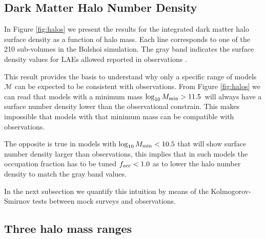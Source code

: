 \documentclass[usenatbib]{mn2e}
\newcommand{\hMsun}{{\ifmmode{h^{-1}{\rm
        {M_{\odot}}}}\else{$h^{-1}{\rm{M_{\odot}}}$}\fi}}
\begin{document}
\subsection{Dark Matter Halo Number Density}

In Figure \ref{fig:halos} we present the results for  the
integrated dark matter halo surface density as a function of halo
mass. Each line corresponds to one of the 210 sub-volumes in the
Bolshoi simulation. The gray band indicates the surface density
values for LAEs allowed reported in observations \citep{Yamada2012}.
 
This result provides the basis to understand why only a specific range of models
${\mathcal M}$ can be expected to be consistent with
observations. From Figure \ref{fig:halos} we can read that models
with a minimum mass $\log_{10} M_{\rm min}>11.5$\hMsun \ will always have a
surface number density lower than the observational
constrain. This makes impossible that models with that minimum mass
can be compatible with observations.


The opposite is true in models with $\log_{10} M_{\rm min}<10.5$
that will show surface number density larger than observations, this
implies that in such models the occupation fraction has to be tuned
$f_{\rm occ}<1.0$ as to lower the halo number density to match the
gray band values.

In the next subsection we quantify this intuition by means of the
Kolmogorov-Smirnov tests between mock surveys and observations. 

\subsection{Three halo mass ranges}
\end{document}
